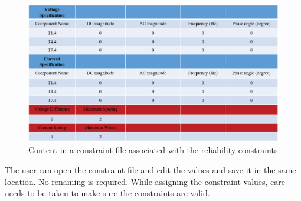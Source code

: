 \documentclass[11pt]{article}
\begin{document}
\begin{enumerate}
    \begin{figure}[t]
    \centering
    \includegraphics[width=\linewidth ]{figs/v_1.9_figs/cons_2.eps}
    \caption{Content in a constraint file associated with the reliability constraints}
    \label{cons_values_new_0_rel_2}
    \end{figure}

 The user can open the constraint file and edit the values and save it in the same location. No renaming is required. While assigning the constraint values, care needs to be taken to make sure the constraints are valid.  

\end{enumerate}
\end{document}
